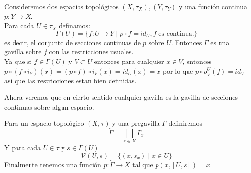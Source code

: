 \documentclass[14pt]{extarticle}
\begin{document}
\begin{ejemplo}{}{}
    Consideremos dos espacios topológicos
    $(X,\tau_X),(Y, \tau_Y)$ y una función 
    continua $p:Y\rightarrow X$.\\
    Para cada $U \in \tau_X$ definamos:
    $$\Gamma(U)=\{f:U\rightarrow Y \mid p\circ f= id_{U}, f \mbox{ es continua.} \}$$
    es decir, el conjunto de secciones continuas de $p$
    sobre $U$. Entonces $\Gamma$ es una gavilla sobre $f$
    con las restricciones usuales.\\
    Ya que si $f\in \Gamma(U)$ y $V\subset U$
    entonces para cualquier $x\in V$, entonces
    $p\circ(f\circ i_V)(x)=(p\circ f)\circ i_V(x)
    =id_U(x)=x$ por lo que $p\circ \rho_{V}^{U}(f) = id_V$
    asi que las restricciones estan bien definidas.
\end{ejemplo}

Ahora veremos que en cierto sentido cualquier
gavilla es la gavilla de secciones continuas
sobre algún espacio.

\begin{definicion}{}{}
    Para un espacio topológico $(X,\tau)$
    y una pregavilla $\Gamma$ definiremos 
    $$\widetilde{\Gamma}=\bigsqcup_{x\in X}\Gamma_x$$
    Y para cada $U\in \tau$ y $s\in \Gamma(U)$
    $$\mathcal{V}(U,s)=\{(x, s_x)\mid x\in U\}$$
    Finalmente tenemos una función $p:\widetilde{\Gamma}\rightarrow X$
    tal que $p(x,[U,s])=x$
\end{definicion}
\end{document}

